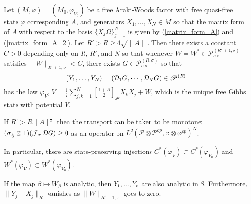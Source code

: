 \begin{thm}\label{thm_summary}
Let $(M,\varphi)=(M_0,\varphi_{V_0})$ be a free Araki-Woods factor with free quasi-free state $\varphi$ corresponding $A$, and generators $X_1,\ldots, X_N\in M$ so that the matrix form of $A$ with respect to the basis $\{X_j\Omega\}_{j=1}^N$ is given by (\ref{matrix_form_A}) and (\ref{matrix_form_A_2}). Let $R'>R\geq4\sqrt{\|A\|}$. Then there exists a constant $C>0$ depending only on $R$, $R'$, and $N$ so that whenever $W=W^*\in\mathscr{P}_{c.s.}^{(R'+1,\sigma)}$ satisfies $\|W\|_{R'+1,\sigma}<C$, there exists $G\in \mathscr{P}_{c.s.}^{(R,\sigma)}$ so that
	\begin{align*}
		(Y_1,\ldots, Y_N)=(\mathcal D_1G,\cdots, \mathcal D_NG) \in \mathscr{P}^{(R)}
	\end{align*}
has the law $\varphi_V$, $V=\frac{1}{2}\sum_{j,k=1}^N \left[\frac{1+A}{2}\right]_{jk}X_kX_j + W$, which is the unique free Gibbs state with potential $V$.\par
If $R'>R\|A\|^\frac{1}{4}$ then the transport can be taken to be monotone: $(\sigma_\frac{i}{2}\otimes 1)(\operatorname{\mathcal J}_\sigma \mathcal D G) \geq 0$ as an operator on $L^2(\mathscr{P}\otimes\mathscr{P}^{op},\varphi\otimes\varphi^{op})^N$.\par
In particular, there are state-preserving injections $C^*(\varphi_V)\subset C^*(\varphi_{V_0})$ and $W^*(\varphi_V)\subset W^*(\varphi_{V_0})$.\par
If the map $\beta\mapsto W_\beta$ is analytic, then $Y_1,\ldots, Y_n$ are also analytic in $\beta$. Furthermore, $\|Y_j-X_j\|_{R}$ vanishes as $\|W\|_{R'+1,\sigma}$ goes to zero.
\end{thm}
